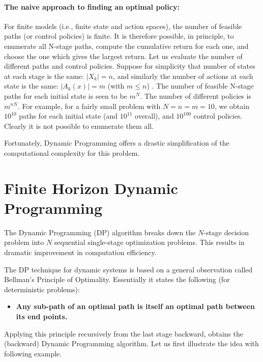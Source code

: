 \paragraph{The naive approach to finding an optimal policy:}  For finite models (i.e., finite state and action spaces), the number of feasible paths (or control policies) is finite.  It is therefore possible, in principle, to enumerate all N-stage paths, compute the cumulative return for each one, and choose the one which gives the largest return.
Let us evaluate the number of different paths and control policies.
Suppose for simplicity that number of states at each stage is the same: $|{X_k}| = n$, and similarly the number of actions at each state is the same: $|{A_k}(x)| = m$ (with $m \le n$) . The number of feasible N-stage paths for each initial state is seen to be ${m^N}$. The number of different policies is ${m^{nN}}$.
For example, for a fairly small problem with $N = n = m = 10$, we obtain ${10^{10}}$ paths for each initial state (and ${10^{11}}$ overall), and ${10^{100}}$ control policies. Clearly it is not possible to enumerate them all.

Fortunately, Dynamic Programming offers a drastic simplification of the computational complexity for this problem.

\section{Finite Horizon Dynamic Programming}

The Dynamic Programming (DP) algorithm breaks down the $N$-stage decision problem into $N$ sequential single-stage optimization problems. This results in dramatic improvement in computation efficiency.

The DP technique for dynamic systems is based on a general observation called Bellman's Principle of Optimality. Essentially it states the following (for deterministic problems):
\begin{itemize}
  \item \textbf{Any sub-path of an optimal path is itself an optimal path between its end points.}
\end{itemize}

Applying this principle recursively from the last stage backward, obtains the (backward) Dynamic Programming algorithm. Let us first illustrate the idea with following example.

